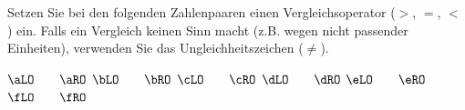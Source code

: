 Setzen Sie bei den folgenden Zahlenpaaren einen Vergleichsoperator ($>$, $=$, $<$) ein. Falls ein Vergleich keinen Sinn macht (z.B. wegen nicht passender Einheiten), verwenden Sie das Ungleichheitszeichen ($\neq$).

\begin{abcliste}
\abc $\aLO \qquad \aRO$
\abc $\bLO \qquad \bRO$
\abc $\cLO \qquad \cRO$
\abc $\dLO \qquad \dRO$
\abc $\eLO \qquad \eRO$
\abc $\fLO \qquad \fRO$
\end{abcliste}
